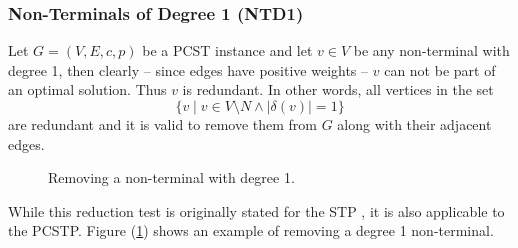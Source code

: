 \subsubsection{Non-Terminals of Degree 1 (NTD1)}
\label{sec:red:test:deg1}
Let $G = (V, E, c, p)$ be a PCST instance and let $v \in V$ be any non-terminal with degree 1, then
 clearly -- since edges have positive weights -- $v$ can not be part of an optimal solution. Thus $v$ is redundant. In other words,
 all vertices in the set
 $$\{v \mid v \in V \setminus N \wedge |\delta(v)| = 1\}$$
 are redundant and it is valid to remove them from $G$ along with their adjacent edges.

\begin{figure}[h]\centering
  \caption{Removing a non-terminal with degree 1.}
  \label{fig:red:test:deg1}
\end{figure}

 While this reduction test is originally stated for the STP \citep{hwang1992steiner}, it is also applicable to the PCSTP. Figure (\ref{fig:red:test:deg1})
  shows an example of removing a degree 1 non-terminal.


